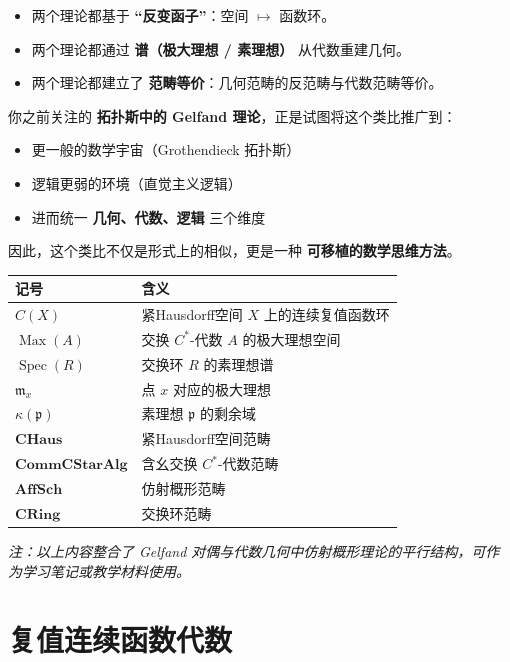 \documentclass[10pt, openany]{book}
\begin{document}
\begin{itemize}
    \item 两个理论都基于 \textbf{“反变函子”}：空间 \(\mapsto\) 函数环。
    \item 两个理论都通过 \textbf{谱（极大理想 / 素理想）} 从代数重建几何。
    \item 两个理论都建立了 \textbf{范畴等价}：几何范畴的反范畴与代数范畴等价。
\end{itemize}

你之前关注的 \textbf{拓扑斯中的 Gelfand 理论}，正是试图将这个类比推广到：
\begin{itemize}
    \item 更一般的数学宇宙（Grothendieck 拓扑斯）
    \item 逻辑更弱的环境（直觉主义逻辑）
    \item 进而统一 \textbf{几何、代数、逻辑} 三个维度
\end{itemize}
因此，这个类比不仅是形式上的相似，更是一种 \textbf{可移植的数学思维方法}。

\begin{table}[h!]
\centering
\begin{tabular}{|p{3.5cm}|p{8cm}|}
\hline
\textbf{记号} & \textbf{含义} \\
\hline
\(C(X)\) & 紧Hausdorff空间 \(X\) 上的连续复值函数环 \\
\hline
\(\operatorname{Max}(A)\) & 交换 \(C^*\)-代数 \(A\) 的极大理想空间 \\
\hline
\(\operatorname{Spec}(R)\) & 交换环 \(R\) 的素理想谱 \\
\hline
\(\mathfrak{m}_x\) & 点 \(x\) 对应的极大理想 \\
\hline
\(\kappa(\mathfrak{p})\) & 素理想 \(\mathfrak{p}\) 的剩余域 \\
\hline
\(\mathbf{CHaus}\) & 紧Hausdorff空间范畴 \\
\hline
\(\mathbf{CommCStarAlg}\) & 含幺交换 \(C^*\)-代数范畴 \\
\hline
\(\mathbf{AffSch}\) & 仿射概形范畴 \\
\hline
\(\mathbf{CRing}\) & 交换环范畴 \\
\hline
\end{tabular}
\end{table}

\vspace{1cm}
\noindent\textit{注：以上内容整合了 Gelfand 对偶与代数几何中仿射概形理论的平行结构，可作为学习笔记或教学材料使用。}



\chapter{复值连续函数代数}
\end{document}
